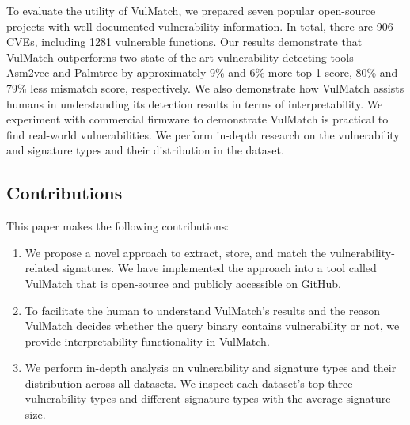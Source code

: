 \documentclass[lettersize,journal]{IEEEtran}
\begin{document}
To evaluate the utility of VulMatch, we prepared seven popular open-source projects with well-documented vulnerability
information. In total, there are 906 CVEs, including 1281
vulnerable functions. Our results demonstrate that VulMatch
outperforms two state-of-the-art vulnerability detecting tools
— Asm2vec and Palmtree by approximately 9\% and 6\% more
top-1 score, 80\% and 79\% less mismatch score, respectively.
We also demonstrate how VulMatch assists humans in understanding its detection results in terms of interpretability.
We experiment with commercial firmware to demonstrate
VulMatch is practical to find real-world vulnerabilities. We 
perform in-depth research on the vulnerability and signature
types and their distribution in the dataset.

\subsection{Contributions}
This paper makes the following contributions:
\begin{enumerate}
 
   \item We propose a novel approach to extract, store, and
match the vulnerability-related signatures. We have implemented the approach into a tool called VulMatch that
is open-source and publicly accessible on GitHub.
   \item To facilitate the human to understand VulMatch’s results
and the reason VulMatch decides whether the query
binary contains vulnerability or not, we provide interpretability functionality in VulMatch.
   \item We perform in-depth analysis on vulnerability and signature types and their distribution across all datasets. We
inspect each dataset’s top three vulnerability types and
different signature types with the average signature size.
\end{enumerate}
\end{document}
